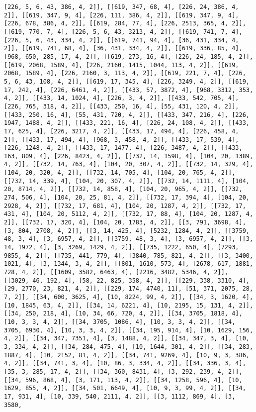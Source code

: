 \documentclass[12pt,fleqn]{article}\usepackage{../../common}
\begin{document}
\begin{verbatim}
[226, 5, 6, 43, 386, 4, 2]], [[619, 347, 68, 4], [226, 24, 386, 4, 2]], [[619, 347, 9, 4], [226, 111, 386, 4, 2]], [[619, 347, 9, 4], [226, 678, 386, 4, 2]], [[619, 284, 77, 4], [226, 2513, 365, 4, 2]], [[619, 770, 7, 4], [226, 5, 6, 43, 3213, 4, 2]], [[619, 741, 7, 4], [226, 5, 6, 43, 334, 4, 2]], [[619, 741, 94, 4], [36, 431, 334, 4, 2]], [[619, 741, 68, 4], [36, 431, 334, 4, 2]], [[619, 336, 85, 4], [968, 650, 285, 17, 4, 2]], [[619, 273, 16, 4], [226, 24, 185, 4, 2]], [[619, 2068, 1589, 4], [226, 2160, 1415, 1044, 113, 4, 2]], [[619, 2068, 1589, 4], [226, 2160, 3, 113, 4, 2]], [[619, 221, 7, 4], [226, 5, 6, 43, 108, 4, 2]], [[619, 17, 345, 4], [226, 3249, 4, 2]], [[619, 17, 242, 4], [226, 6461, 4, 2]], [[433, 57, 3872, 4], [968, 3312, 353, 4, 2]], [[433, 14, 1024, 4], [226, 3, 4, 2]], [[433, 542, 705, 4], [226, 765, 318, 4, 2]], [[433, 250, 16, 4], [55, 431, 120, 4, 2]], [[433, 250, 16, 4], [55, 431, 720, 4, 2]], [[433, 347, 216, 4], [226, 1947, 1488, 4, 2]], [[433, 221, 16, 4], [226, 24, 108, 4, 2]], [[433, 17, 625, 4], [226, 3217, 4, 2]], [[433, 17, 494, 4], [226, 458, 4, 2]], [[433, 17, 494, 4], [968, 3, 458, 4, 2]], [[433, 17, 539, 4], [226, 1248, 4, 2]], [[433, 17, 1477, 4], [226, 3487, 4, 2]], [[433, 163, 809, 4], [226, 8423, 4, 2]], [[732, 14, 1598, 4], [104, 20, 1389, 4, 2]], [[732, 14, 763, 4], [104, 20, 307, 4, 2]], [[732, 14, 329, 4], [104, 20, 320, 4, 2]], [[732, 14, 705, 4], [104, 20, 765, 4, 2]], [[732, 14, 339, 4], [104, 20, 307, 4, 2]], [[732, 14, 1111, 4], [104, 20, 8714, 4, 2]], [[732, 14, 858, 4], [104, 20, 965, 4, 2]], [[732, 274, 506, 4], [104, 20, 25, 81, 4, 2]], [[732, 17, 394, 4], [104, 20, 2928, 4, 2]], [[732, 17, 681, 4], [104, 20, 1287, 4, 2]], [[732, 17, 431, 4], [104, 20, 5112, 4, 2]], [[732, 17, 88, 4], [104, 20, 1287, 4, 2]], [[732, 17, 320, 4], [104, 20, 1783, 4, 2]], [[3, 791, 3698, 4], [3, 804, 2708, 4, 2]], [[3, 14, 425, 4], [5232, 1284, 4, 2]], [[3759, 48, 3, 4], [3, 6957, 4, 2]], [[3759, 48, 3, 4], [3, 6957, 4, 2]], [[3, 14, 1972, 4], [3, 3269, 1429, 4, 2]], [[735, 1222, 650, 4], [7293, 9855, 4, 2]], [[735, 441, 779, 4], [3840, 785, 821, 4, 2]], [[3, 3400, 1021, 4], [3, 1344, 3, 4, 2]], [[801, 1610, 573, 4], [2678, 617, 1881, 728, 4, 2]], [[1609, 3582, 6463, 4], [2216, 3482, 5346, 4, 2]], [[3029, 46, 192, 4], [58, 22, 825, 358, 4, 2]], [[229, 338, 3310, 4], [29, 2770, 23, 821, 4, 2]], [[229, 174, 4740, 11], [51, 371, 2075, 28, 7, 2]], [[34, 600, 3625, 4], [10, 8224, 99, 4, 2]], [[34, 3, 1620, 4], [10, 1845, 63, 4, 2]], [[34, 14, 6221, 4], [10, 2195, 15, 131, 4, 2]], [[34, 250, 218, 4], [10, 34, 66, 720, 4, 2]], [[34, 3705, 1818, 4], [10, 3, 3, 4, 2]], [[34, 3705, 1086, 4], [10, 3, 3, 4, 2]], [[34, 3705, 6930, 4], [10, 3, 3, 4, 2]], [[34, 195, 914, 4], [10, 1629, 156, 4, 2]], [[34, 347, 7351, 4], [3, 1488, 4, 2]], [[34, 347, 3, 4], [10, 3, 334, 4, 2]], [[34, 284, 475, 4], [10, 1644, 301, 4, 2]], [[34, 283, 1887, 4], [10, 2152, 81, 4, 2]], [[34, 741, 9269, 4], [10, 9, 3, 386, 4, 2]], [[34, 741, 3, 4], [10, 86, 3, 334, 4, 2]], [[34, 336, 3, 4], [35, 3, 285, 17, 4, 2]], [[34, 360, 8431, 4], [3, 292, 239, 4, 2]], [[34, 596, 868, 4], [3, 171, 113, 4, 2]], [[34, 1258, 596, 4], [10, 1629, 855, 4, 2]], [[34, 501, 6649, 4], [10, 9, 3, 99, 4, 2]], [[34, 17, 931, 4], [10, 339, 540, 2111, 4, 2]], [[3, 1112, 869, 4], [3, 3580, 
\end{verbatim}
\end{document}
